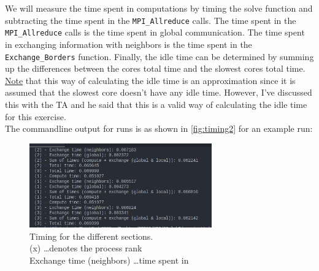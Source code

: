 We will measure the time spent in computations by timing the solve function and subtracting the time spent in the \texttt{MPI\_Allreduce} calls. The time spent in the \texttt{MPI\_Allreduce} calls is the time spent in global communication. The time spent in exchanging information with neighbors is the time spent in the \texttt{Exchange\_Borders} function. Finally, the idle time can be determined by summing up the differences between the cores total time and the slowest cores total time. \underline{Note} that this way of calculating the idle time is an approximation since it is assumed that the slowest core doesn't have any idle time. However, I've discussed this with the TA and he said that this is a valid way of calculating the idle time for this exercise.\\
The commandline output for runs is as shown in \autoref{fig:timing2} for an example run: 
\begin{figure}[H]
    \centering
    \includegraphics[width=0.7\textwidth]{../fig/lab2/ex2.png}
    \caption{Timing for the different sections.\\
    (x) \dots denotes the process rank\\
    Exchange time (neighbors) \dots time spent in \texttt{}}
    \label{fig:timing2}
\end{figure}
